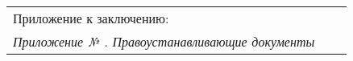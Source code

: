{\begin{longtable}{G{25mm}|M{44mm}|G{70mm}}
\vspace{5mm}

\relax
\noindent Приложение к заключению:\\
\textit{
	Приложение № \Rownum. Правоустанавливающие документы}
%

\end{longtable}}
